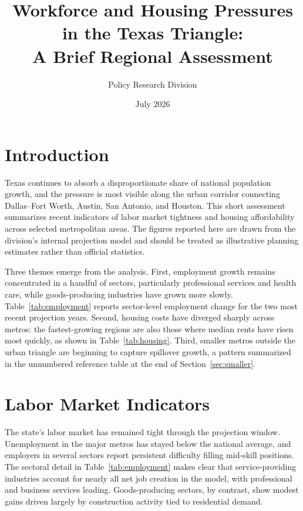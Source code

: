 \documentclass[11pt]{article}
\title{Workforce and Housing Pressures in the Texas Triangle:\\A Brief Regional Assessment}
\author{Policy Research Division}
\date{July 2026}
\begin{document}
\maketitle

\section{Introduction}

Texas continues to absorb a disproportionate share of national population growth,
and the pressure is most visible along the urban corridor connecting Dallas--Fort
Worth, Austin, San Antonio, and Houston. This short assessment summarizes recent
indicators of labor market tightness and housing affordability across selected
metropolitan areas. The figures reported here are drawn from the division's
internal projection model and should be treated as illustrative planning
estimates rather than official statistics.

Three themes emerge from the analysis. First, employment growth remains
concentrated in a handful of sectors, particularly professional services and
health care, while goods-producing industries have grown more slowly.
Table~\ref{tab:employment} reports sector-level employment change for the two
most recent projection years. Second, housing costs have diverged sharply across
metros: the fastest-growing regions are also those where median rents have risen
most quickly, as shown in Table~\ref{tab:housing}. Third, smaller metros outside
the urban triangle are beginning to capture spillover growth, a pattern
summarized in the unnumbered reference table at the end of
Section~\ref{sec:smaller}.

\section{Labor Market Indicators}
\label{sec:labor}

The state's labor market has remained tight through the projection window.
Unemployment in the major metros has stayed below the national average, and
employers in several sectors report persistent difficulty filling mid-skill
positions. The sectoral detail in Table~\ref{tab:employment} makes clear that
service-providing industries account for nearly all net job creation in the
model, with professional and business services leading. Goods-producing
sectors, by contrast, show modest gains driven largely by construction activity
tied to residential demand.
\end{document}
